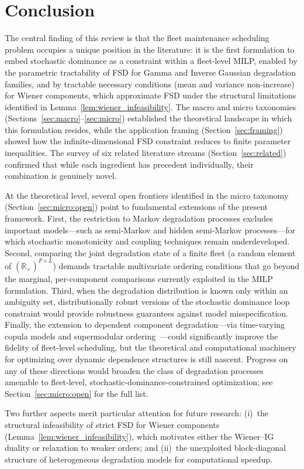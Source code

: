 \documentclass[11pt,a4paper]{article}
\theoremstyle{plain}
\theoremstyle{definition}
\theoremstyle{remark}
\begin{document}
\newpage

\section{Conclusion}
\label{sec:conclusion}

The central finding of this review is that the fleet maintenance scheduling problem occupies a unique position in the literature: it is the first formulation to embed stochastic dominance as a constraint within a fleet-level MILP, enabled by the parametric tractability of FSD for Gamma and Inverse Gaussian degradation families, and by tractable necessary conditions (mean and variance non-increase) for Wiener components, which approximate FSD under the structural limitations identified in Lemma~\ref{lem:wiener_infeasibility}. The macro and micro taxonomies (Sections~\ref{sec:macro}--\ref{sec:micro}) established the theoretical landscape in which this formulation resides, while the application framing (Section~\ref{sec:framing}) showed how the infinite-dimensional FSD constraint reduces to finite parameter inequalities. The survey of six related literature streams (Section~\ref{sec:related}) confirmed that while each ingredient has precedent individually, their combination is genuinely novel.

At the theoretical level, several open frontiers identified in the micro taxonomy
(Section~\ref{sec:micro:open}) point to fundamental extensions of the present
framework.  First, the restriction to Markov degradation processes excludes important
models---such as semi-Markov and hidden semi-Markov processes---for which stochastic
monotonicity and coupling techniques remain underdeveloped.  Second, comparing the
joint degradation state of a finite fleet (a random element of
$(\mathbb{R}_+)^{F \times L}$) demands tractable multivariate ordering conditions
that go beyond the marginal, per-component comparisons currently exploited in the
MILP formulation.  Third, when the degradation distribution is known only within an
ambiguity set, distributionally robust versions of the stochastic dominance loop
constraint would provide robustness guarantees against model misspecification.
Finally, the extension to dependent component degradation---via time-varying copula
models and supermodular ordering~\cite{joe2015,muller2006}---could significantly
improve the fidelity of fleet-level scheduling, but the theoretical and computational
machinery for optimizing over dynamic dependence structures is still nascent.
Progress on any of these directions would broaden the class of degradation processes
amenable to fleet-level, stochastic-dominance-constrained optimization; see
Section~\ref{sec:micro:open} for the full list.

Two further aspects merit particular attention for future research: (i)~the structural infeasibility of strict FSD for Wiener components (Lemma~\ref{lem:wiener_infeasibility}), which motivates either the Wiener--IG duality or relaxation to weaker orders; and (ii)~the unexploited block-diagonal structure of heterogeneous degradation models for computational speedup.


\end{document}
